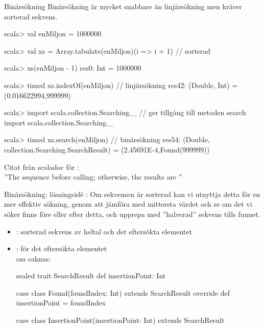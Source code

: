
\begin{Slide}{Binärsökning}
Binärsökning är mycket snabbare än linjärsökning men kräver sorterad sekvens.
\begin{REPL}[basicstyle=\color{white}\ttfamily\SlideFontSize{6.5}{8}]
scala> val enMiljon = 1000000

scala> val xs = Array.tabulate(enMiljon)(i => i + 1)   // sorterad

scala> xs(enMiljon - 1)
res0: Int = 1000000

scala> timed { xs.indexOf(enMiljon) }        // linjärsökning
res42: (Double, Int) = (0.016622994,999999)

scala> import scala.collection.Searching._  // ger tillgång till metoden search
import scala.collection.Searching._

scala> timed { xs.search(enMiljon) }        // binärsökning
res54: (Double, collection.Searching.SearchResult) = (2.45691E-4,Found(999999))

\end{REPL}
\pause
Citat från scaladoc för :\\
''The sequence  before calling; otherwise, the results are ''
\end{Slide}

\begin{Slide}{Binärsökning: lösningsidé}
: Om sekvensen är sorterad kan vi utnyttja detta för en mer effektiv sökning, genom att jämföra med mittersta värdet och se om det vi söker finns före eller efter detta, och upprepa med ''halverad'' sekvens tills funnet.
\pause
\begin{itemize}\SlideFontSmall
\item {}: sorterad sekvens av heltal och det eftersökta elementet
\item {}:  för det eftersökta elementet
\\ om saknas: 
\pause
\begin{Code}
sealed trait SearchResult {
  def insertionPoint: Int
}

case class Found(foundIndex: Int) extends SearchResult {
  override def insertionPoint = foundIndex
}

case class InsertionPoint(insertionPoint: Int) extends SearchResult
\end{Code}
\end{itemize}
\end{Slide}

